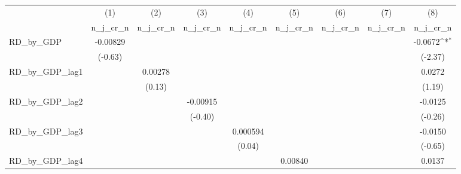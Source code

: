 {
\def\sym#1{\ifmmode^{#1}\else\(^{#1}\)\fi}
\begin{tabular}{l*{8}{c}}
\toprule
          &\multicolumn{1}{c}{(1)}&\multicolumn{1}{c}{(2)}&\multicolumn{1}{c}{(3)}&\multicolumn{1}{c}{(4)}&\multicolumn{1}{c}{(5)}&\multicolumn{1}{c}{(6)}&\multicolumn{1}{c}{(7)}&\multicolumn{1}{c}{(8)}\\
          &\multicolumn{1}{c}{n\_j\_cr\_n}&\multicolumn{1}{c}{n\_j\_cr\_n}&\multicolumn{1}{c}{n\_j\_cr\_n}&\multicolumn{1}{c}{n\_j\_cr\_n}&\multicolumn{1}{c}{n\_j\_cr\_n}&\multicolumn{1}{c}{n\_j\_cr\_n}&\multicolumn{1}{c}{n\_j\_cr\_n}&\multicolumn{1}{c}{n\_j\_cr\_n}\\
\midrule
RD\_by\_GDP & -0.00829         &                  &                  &                  &                  &                  &                  &  -0.0672\sym{*}  \\
          &  (-0.63)         &                  &                  &                  &                  &                  &                  &  (-2.37)         \\
\addlinespace
RD\_by\_GDP\_lag1&                  &  0.00278         &                  &                  &                  &                  &                  &   0.0272         \\
          &                  &   (0.13)         &                  &                  &                  &                  &                  &   (1.19)         \\
\addlinespace
RD\_by\_GDP\_lag2&                  &                  & -0.00915         &                  &                  &                  &                  &  -0.0125         \\
          &                  &                  &  (-0.40)         &                  &                  &                  &                  &  (-0.26)         \\
\addlinespace
RD\_by\_GDP\_lag3&                  &                  &                  & 0.000594         &                  &                  &                  &  -0.0150         \\
          &                  &                  &                  &   (0.04)         &                  &                  &                  &  (-0.65)         \\
\addlinespace
RD\_by\_GDP\_lag4&                  &                  &                  &                  &  0.00840         &                  &                  &   0.0137         \\

\end{tabular}}
